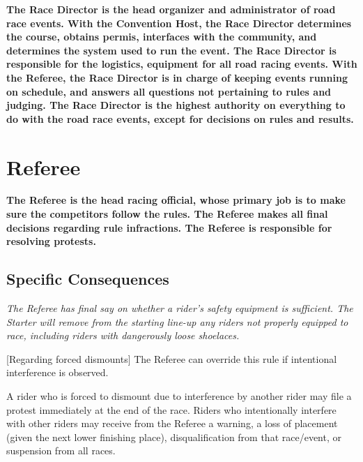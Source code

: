 \textbf{The Race Director is the head organizer and administrator of road race
events.  With the Convention Host, the Race Director determines the course,
obtains permis, interfaces with the community, and determines the system
used to run the event.  The Race Director is responsible for the logistics,
equipment for all road racing events.  With the Referee, the
Race Director is in charge of keeping events running on schedule, and
answers all questions not pertaining to rules and judging.  The Race
Director is the highest authority on everything to do with the road race
events, except for decisions on rules and results.}

\section{Referee}

\textbf{The Referee is the head racing official, whose primary job is to make sure
the competitors follow the rules.  The Referee makes all final decisions
regarding rule infractions. The Referee is responsible for resolving
protests.}

\subsection{Specific Consequences}

\textit{The Referee has final say on whether a rider's safety equipment is sufficient. 
The Starter will remove from the starting line-up any riders not properly equipped to race, including riders with dangerously loose shoelaces.}

[Regarding forced dismounts] The Referee can override this rule if intentional interference is observed.

A rider who is forced to dismount due to interference by another rider may file a protest immediately at the end of the race.
Riders who intentionally interfere with other riders may receive from the Referee a warning, a loss of placement (given the next lower finishing place), disqualification from that race/event, or suspension from all races.
